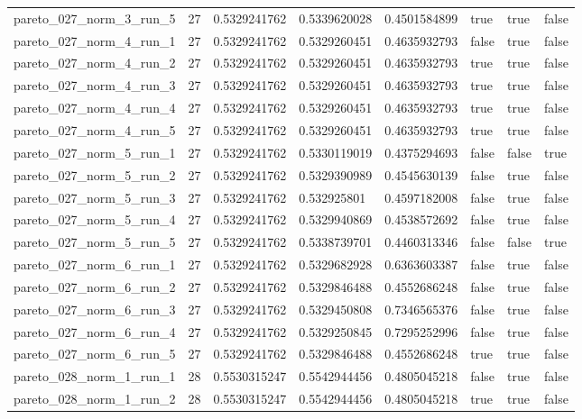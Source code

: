 \begin{tabular}{@{}llllllll@{}}
pareto\_027\_norm\_3\_run\_5 & 27 & 0.5329241762 & 0.5339620028 & 0.4501584899 & true & true & false \\
pareto\_027\_norm\_4\_run\_1 & 27 & 0.5329241762 & 0.5329260451 & 0.4635932793 & false & true & false \\
pareto\_027\_norm\_4\_run\_2 & 27 & 0.5329241762 & 0.5329260451 & 0.4635932793 & true & true & false \\
pareto\_027\_norm\_4\_run\_3 & 27 & 0.5329241762 & 0.5329260451 & 0.4635932793 & true & true & false \\
pareto\_027\_norm\_4\_run\_4 & 27 & 0.5329241762 & 0.5329260451 & 0.4635932793 & true & true & false \\
pareto\_027\_norm\_4\_run\_5 & 27 & 0.5329241762 & 0.5329260451 & 0.4635932793 & true & true & false \\
pareto\_027\_norm\_5\_run\_1 & 27 & 0.5329241762 & 0.5330119019 & 0.4375294693 & false & false & true \\
pareto\_027\_norm\_5\_run\_2 & 27 & 0.5329241762 & 0.5329390989 & 0.4545630139 & false & true & false \\
pareto\_027\_norm\_5\_run\_3 & 27 & 0.5329241762 & 0.532925801 & 0.4597182008 & false & true & false \\
pareto\_027\_norm\_5\_run\_4 & 27 & 0.5329241762 & 0.5329940869 & 0.4538572692 & false & true & false \\
pareto\_027\_norm\_5\_run\_5 & 27 & 0.5329241762 & 0.5338739701 & 0.4460313346 & false & false & true \\
pareto\_027\_norm\_6\_run\_1 & 27 & 0.5329241762 & 0.5329682928 & 0.6363603387 & false & true & false \\
pareto\_027\_norm\_6\_run\_2 & 27 & 0.5329241762 & 0.5329846488 & 0.4552686248 & false & true & false \\
pareto\_027\_norm\_6\_run\_3 & 27 & 0.5329241762 & 0.5329450808 & 0.7346565376 & false & true & false \\
pareto\_027\_norm\_6\_run\_4 & 27 & 0.5329241762 & 0.5329250845 & 0.7295252996 & false & true & false \\
pareto\_027\_norm\_6\_run\_5 & 27 & 0.5329241762 & 0.5329846488 & 0.4552686248 & true & true & false \\
pareto\_028\_norm\_1\_run\_1 & 28 & 0.5530315247 & 0.5542944456 & 0.4805045218 & false & true & false \\
pareto\_028\_norm\_1\_run\_2 & 28 & 0.5530315247 & 0.5542944456 & 0.4805045218 & true & true & false \\

\end{tabular}
